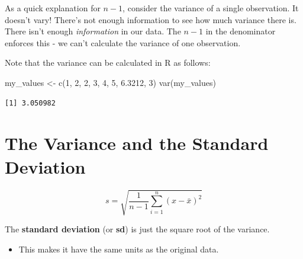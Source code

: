 \documentclass[
  letterpaper,
  DIV=11,
  numbers=noendperiod]{scrreprt}
\newenvironment{Shaded}{\begin{snugshade}}{\end{snugshade}}
\newcommand{\DecValTok}[1]{\textcolor[rgb]{0.68,0.00,0.00}{#1}}
\newcommand{\FloatTok}[1]{\textcolor[rgb]{0.68,0.00,0.00}{#1}}
\newcommand{\FunctionTok}[1]{\textcolor[rgb]{0.28,0.35,0.67}{#1}}
\newcommand{\NormalTok}[1]{\textcolor[rgb]{0.00,0.23,0.31}{#1}}
\newcommand{\OtherTok}[1]{\textcolor[rgb]{0.00,0.23,0.31}{#1}}
\providecommand{\tightlist}{%
  \setlength{\itemsep}{0pt}\setlength{\parskip}{0pt}}\usepackage{longtable,booktabs,array}
\begin{document}
\begin{tcolorbox}[enhanced jigsaw, opacitybacktitle=0.6, left=2mm, colbacktitle=quarto-callout-note-color!10!white, colframe=quarto-callout-note-color-frame, breakable, toptitle=1mm, title=\textcolor{quarto-callout-note-color}{\faInfo}\hspace{0.5em}{\(n-1\) in the denominator}, opacityback=0, bottomrule=.15mm, toprule=.15mm, arc=.35mm, leftrule=.75mm, titlerule=0mm, bottomtitle=1mm, colback=white, rightrule=.15mm, coltitle=black]

As a quick explanation for \(n-1\), consider the variance of a single
observation. It doesn't vary! There's not enough information to see how
much variance there is. There isn't enough \emph{information} in our
data. The \(n-1\) in the denominator enforces this - we can't calculate
the variance of one observation.

\end{tcolorbox}

Note that the variance can be calculated in R as follows:

\begin{Shaded}
\begin{Highlighting}[]
\NormalTok{my\_values }\OtherTok{\textless{}{-}} \FunctionTok{c}\NormalTok{(}\DecValTok{1}\NormalTok{, }\DecValTok{2}\NormalTok{, }\DecValTok{2}\NormalTok{, }\DecValTok{3}\NormalTok{, }\DecValTok{4}\NormalTok{, }\DecValTok{5}\NormalTok{, }\FloatTok{6.3212}\NormalTok{, }\DecValTok{3}\NormalTok{)}
\FunctionTok{var}\NormalTok{(my\_values)}
\end{Highlighting}
\end{Shaded}

\begin{verbatim}
[1] 3.050982
\end{verbatim}

\hypertarget{the-variance-and-the-standard-deviation}{%
\section{The Variance and the Standard
Deviation}\label{the-variance-and-the-standard-deviation}}

\[
s = \sqrt{\frac{1}{n-1}\sum_{i=1}^n(x - \bar x)^2}
\]

The \textbf{standard deviation} (or \textbf{sd}) is just the square root
of the variance.

\begin{itemize}
\tightlist
\item
  This makes it have the same units as the original data.
\end{itemize}
\end{document}
